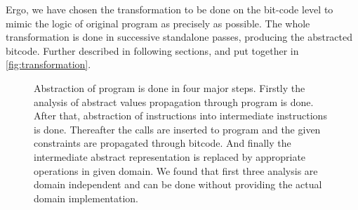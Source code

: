 Ergo, we have chosen the transformation to be done on the \LLVM bit-code level to
mimic the logic of original program as precisely as possible. The whole
transformation is done in successive standalone \LLVM passes, producing the
abstracted \LLVM bitcode. Further described in following sections, and put
together in \autoref{fig:transformation}.

\begin{figure}[!ht]


\caption{Abstraction of program is done in four major steps. Firstly the
analysis of abstract values propagation through program is done. After that,
abstraction of instructions into intermediate \LART instructions is done.
Thereafter the  calls are inserted to program and the given
constraints are propagated through bitcode. And finally the intermediate
abstract representation is replaced by appropriate operations in given domain.
We found that first three analysis are domain independent and can be done
without providing the actual domain implementation.
}
\label{fig:transformation}
\end{figure}


